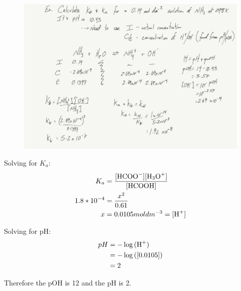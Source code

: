\documentclass{article}
\begin{document}
\begin{enumerate}
\begin{figure}[H]
\includegraphics[width=\textwidth]{4.4ex1.jpg}
\end{figure}


Solving for $K_{a}$:
\begin{align*}
K_a &= \frac{[\ce{HCOO-}][\ce{H3O+}]}{[\ce{HCOOH}]}\\
1.8*10^{-4} &= \frac{x^2}{0.61}\\
x&= 0.0105 mol dm^{-3} = [\ce{H+}]\\
\end{align*}

Solving for pH:
\begin{align*}
pH &= -\log{(\ce{H+})}\\
&= -\log{([0.0105])}\\
&= 2
\end{align*}

Therefore the pOH is 12 and the pH is 2.



\end{enumerate}
\end{document}

